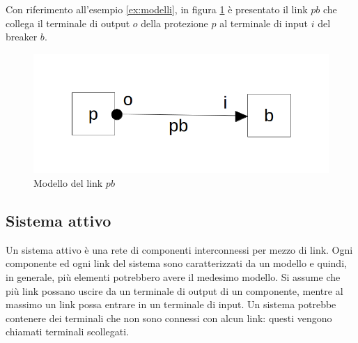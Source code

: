 \begin{ex}\label{ex:link}
Con riferimento all'esempio \ref{ex:modelli}, in figura \ref{fig:model_link} è presentato il link $pb$ che collega il terminale di output $o$ della protezione $p$ al terminale di input $i$ del breaker $b$.
\end{ex}

\begin{figure}[htbp]
\centering
\includegraphics[scale=0.4]{./Img/sa/link.png}
\caption{Modello del link $pb$}
\label{fig:model_link}
\end{figure}

\subsection{Sistema attivo}
Un sistema attivo è una rete di componenti interconnessi per mezzo di link. Ogni componente ed ogni link del sistema sono caratterizzati da un modello e quindi, in generale, più elementi potrebbero avere il medesimo modello. Si assume che più link possano uscire da un terminale di output di un componente, mentre al massimo un link possa entrare in un terminale di input.
Un sistema potrebbe contenere dei terminali che non sono connessi con alcun link: questi vengono chiamati terminali scollegati.

